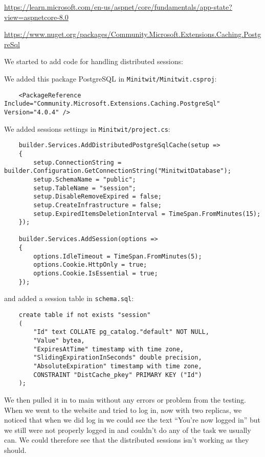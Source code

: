 \url{https://learn.microsoft.com/en-us/aspnet/core/fundamentals/app-state?view=aspnetcore-8.0}

\url{https://www.nuget.org/packages/Community.Microsoft.Extensions.Caching.PostgreSql}

We started to add code for handling distributed sessions:

We added this package PostgreSQL in \texttt{Minitwit/Minitwit.csproj}:

\begin{verbatim}
    <PackageReference Include="Community.Microsoft.Extensions.Caching.PostgreSql" Version="4.0.4" />
\end{verbatim}

We added sessions settings in \texttt{Minitwit/project.cs}:

\begin{verbatim}
    builder.Services.AddDistributedPostgreSqlCache(setup =>
    {
        setup.ConnectionString = builder.Configuration.GetConnectionString("MinitwitDatabase");
        setup.SchemaName = "public";
        setup.TableName = "session";
        setup.DisableRemoveExpired = false;
        setup.CreateInfrastructure = false;
        setup.ExpiredItemsDeletionInterval = TimeSpan.FromMinutes(15);
    });

    builder.Services.AddSession(options =>
    {
        options.IdleTimeout = TimeSpan.FromMinutes(5);
        options.Cookie.HttpOnly = true;
        options.Cookie.IsEssential = true;
    });
\end{verbatim}

and added a session table in \texttt{schema.sql}:
\begin{verbatim}
    create table if not exists "session"
    (
        "Id" text COLLATE pg_catalog."default" NOT NULL,
        "Value" bytea,
        "ExpiresAtTime" timestamp with time zone,
        "SlidingExpirationInSeconds" double precision,
        "AbsoluteExpiration" timestamp with time zone,
        CONSTRAINT "DistCache_pkey" PRIMARY KEY ("Id")
    );
\end{verbatim}

We then pulled it in to main without any errors or problem from the testing. When we went to the website and tried to log in, now with two replicas, we noticed that when we did log in we could see the text ``You're now logged in'' but we still were not properly logged in and couldn't do any of the task we usually can. We could therefore see that the distributed sessions isn't working as they should.

